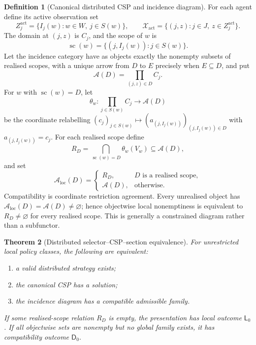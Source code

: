 \documentclass[11pt]{article}
\theoremstyle{plain}
\newtheorem{theorem}{Theorem}[section]
\theoremstyle{definition}
\newtheorem{definition}[theorem]{Definition}
\theoremstyle{remark}
\newcommand{\LocalAdm}{\mathcal{A}_{\mathrm{loc}}}
\begin{document}
\begin{definition}[Canonical distributed CSP and incidence diagram]
\label{def:distributed-csp}
For each agent define its active observation set
\[
Z_j^{\mathrm{act}}=\{I_j(w):w\in W,\ j\in S(w)\},
\qquad
\mathcal X_{\mathrm{act}}
=\{(j,z):j\in J,\ z\in Z_j^{\mathrm{act}}\}.
\]
The domain at $(j,z)$ is $C_j$, and the scope of $w$ is
\[
\operatorname{sc}(w)=\{(j,I_j(w)):j\in S(w)\}.
\]
Let the incidence category have as objects exactly the nonempty subsets of
realised scopes, with a unique arrow from $D$ to $E$ precisely when
$E\subseteq D$, and put
\[
\mathcal A(D)=\prod_{(j,z)\in D}C_j.
\]
For $w$ with $\operatorname{sc}(w)=D$, let
\[
\theta_w:\prod_{j\in S(w)}C_j\to\mathcal A(D)
\]
be the coordinate relabelling
$(c_j)_{j\in S(w)}\mapsto(a_{(j,I_j(w))})_{(j,I_j(w))\in D}$ with
$a_{(j,I_j(w))}=c_j$. For each realised scope define
\[
R_D=\bigcap_{\operatorname{sc}(w)=D}\theta_w(V_w)
\subseteq\mathcal A(D),
\]
and set
\[
\LocalAdm(D)=
\begin{cases}
R_D,&D\text{ is a realised scope},\\
\mathcal A(D),&\text{otherwise}.
\end{cases}
\]
Compatibility is coordinate restriction agreement. Every unrealised object has
$\LocalAdm(D)=\mathcal A(D)\ne\varnothing$; hence objectwise local nonemptiness
is equivalent to $R_D\ne\varnothing$ for every realised scope. This is generally
a constrained diagram rather than a subfunctor.
\end{definition}

\begin{theorem}[Distributed selector--CSP--section equivalence]
\label{thm:distributed-equivalence}
For unrestricted local policy classes, the following are equivalent:
\begin{enumerate}[label=(\roman*)]
\item a valid distributed strategy exists;
\item the canonical CSP has a solution;
\item the incidence diagram has a compatible admissible family.
\end{enumerate}
If some realised-scope relation $R_D$ is empty, the presentation has local
outcome $\mathsf L_0$. If all objectwise sets are nonempty but no global family
exists, it has compatibility outcome $\mathsf D_0$.
\end{theorem}
\end{document}
